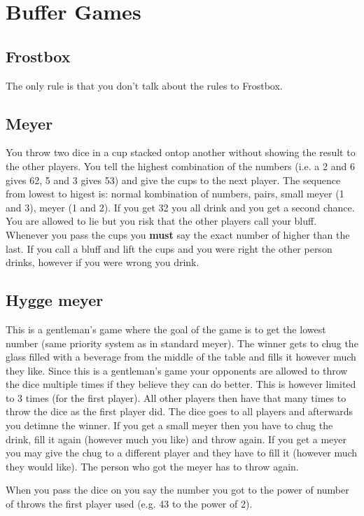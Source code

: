 \documentclass[../../../main.tex]{subfiles}
\begin{document}
\section{Buffer Games}
\begin{multicols}{2}
\subsection*{Frostbox}
    The only rule is that you don't talk about the rules to Frostbox.

\subsection*{Meyer}
    You throw two dice in a cup stacked ontop another without showing the result to the other players. You tell the highest combination of the numbers (i.e. a 2 and 6 gives 62, 5 and 3 gives 53) and give the cups to the next player. The sequence from lowest to higest is: normal kombination of numbers, pairs, small meyer (1 and 3), meyer (1 and 2). If you get 32 you all drink and you get a second chance. You are allowed to lie but you risk that the other players call your bluff. Whenever you pass the cups you \textbf{must} say the exact number of higher than the last. If you call a bluff and lift the cups and you were right the other person drinks, however if you were wrong you drink.

\subsection*{Hygge meyer}
    This is a gentleman's game where the goal of the game is to get the lowest number (same priority system as in standard meyer). The winner gets to chug the glass filled with a beverage from the middle of the table and fills it however much they like. Since this is a gentleman's game your opponents are allowed to throw the dice multiple times if they believe they can do better. This is however limited to 3 times (for the first player). All other players then have that many times to throw the dice as the first player did. The dice goes to all players and afterwards you detimne the winner. If you get a small meyer then you have to chug the drink, fill it again (however much you like) and throw again. If you get a meyer you may give the chug to a different player and they have to fill it (however much they would like). The person who got the meyer has to throw again.
    
    When you pass the dice on you say the number you got to the power of number of throws the first player used (e.g. 43 to the power of 2).
    

\end{multicols}
\end{document}
